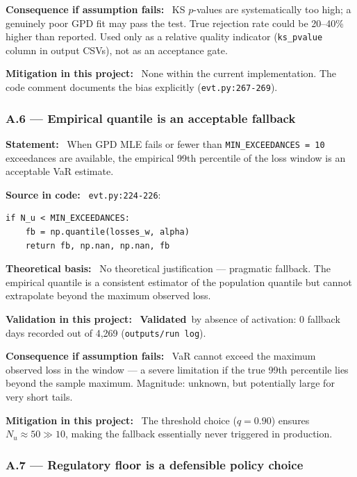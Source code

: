 \documentclass[11pt,a4paper]{article}
\newcommand{\asmfield}[1]{\medskip\noindent\textbf{#1:}\ }
\newcommand{\code}[1]{\texttt{#1}}
\newcommand{\validated}{\textbf{Validated}}
\begin{document}
\asmfield{Consequence if assumption fails}
KS $p$-values are systematically too high; a genuinely poor GPD fit may
pass the test. True rejection rate could be 20--40\% higher than reported.
Used only as a relative quality indicator (\code{ks\_pvalue} column in
output CSVs), not as an acceptance gate.

\asmfield{Mitigation in this project}
None within the current implementation. The code comment documents the
bias explicitly (\code{evt.py:267-269}).

\subsubsection{A.6 --- Empirical quantile is an acceptable fallback}\label{asm:A6}

\asmfield{Statement}
When GPD MLE fails or fewer than \code{MIN\_EXCEEDANCES = 10} exceedances
are available, the empirical 99th percentile of the loss window is an
acceptable VaR estimate.

\asmfield{Source in code}
\code{evt.py:224-226}:
\begin{lstlisting}
if N_u < MIN_EXCEEDANCES:
    fb = np.quantile(losses_w, alpha)
    return fb, np.nan, np.nan, fb
\end{lstlisting}

\asmfield{Theoretical basis}
No theoretical justification --- pragmatic fallback. The empirical quantile
is a consistent estimator of the population quantile but cannot extrapolate
beyond the maximum observed loss.

\asmfield{Validation in this project}
\validated\ by absence of activation: 0 fallback days recorded out of 4{,}269
(\code{outputs/run log}).

\asmfield{Consequence if assumption fails}
VaR cannot exceed the maximum observed loss in the window --- a severe
limitation if the true 99th percentile lies beyond the sample maximum.
Magnitude: unknown, but potentially large for very short tails.

\asmfield{Mitigation in this project}
The threshold choice ($q = 0.90$) ensures $N_u \approx 50 \gg 10$,
making the fallback essentially never triggered in production.

\subsubsection{A.7 --- Regulatory floor is a defensible policy choice}\label{asm:A7}
\end{document}
